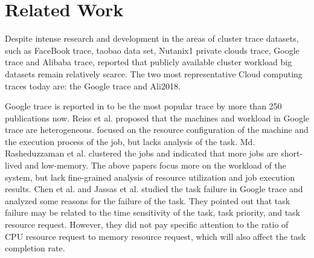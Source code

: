 \documentclass[conference]{IEEEtran}
\begin{document}


\section{Related Work}\label{Sec:relatedwork}
Despite intense research and development in the areas of cluster trace datasets, such as FaceBook trace\cite{FacebookTrace}, taobao data set\cite{Ren2014WorkloadTaobao}, Nutanix1 private clouds trace\cite{cano2016characterizing}, Google trace and Alibaba trace, \cite{George2018Diversity} reported that  publicly available cluster workload big datasets remain relatively scarce. The two most representative  Cloud computing traces today are: the Google trace and Ali2018.

Google trace is reported in \cite{George2018Diversity} to be the most popular trace by more than 250 publications now. Reiss et al.\cite{reiss2012heterogeneity} proposed that the machines and workload in Google trace are heterogeneous. \cite{Minet2018Machine} focused on the resource configuration of the machine and the execution process of the job, but lacks analysis of the task. Md. Rasheduzzaman et al.\cite{rasheduzzaman2014task} clustered the jobs and indicated that more jobs are short-lived and low-memory. The above papers focus more on the workload of the system, but lack fine-grained analysis of resource utilization and job execution results. Chen et al.\cite{chen2014failure} and Jassas et al.\cite{jassas2018failure}
studied the task failure in Google trace and analyzed some reasons for the failure of the task. They pointed out that task failure may be related to the time sensitivity of the task, task priority, and task resource request. However, they did not pay specific attention to the ratio of CPU resource request to memory resource request, which will also affect the task completion rate.
\end{document}

